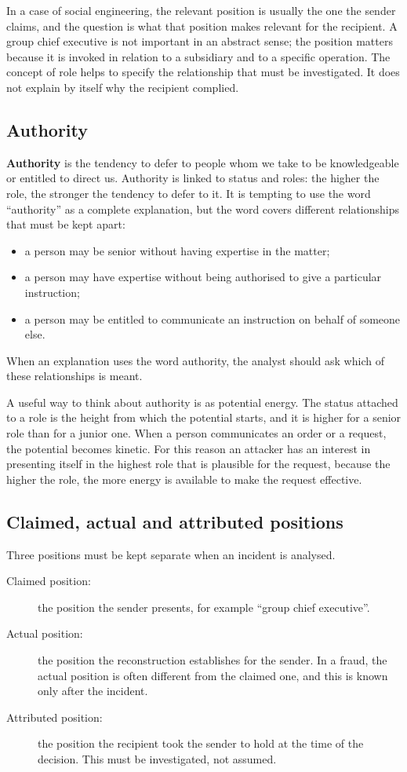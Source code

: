 In a case of social engineering, the relevant position is usually the one the sender claims, and the question is what that position makes relevant for the recipient. A group chief executive is not important in an abstract sense; the position matters because it is invoked in relation to a subsidiary and to a specific operation. The concept of role helps to specify the relationship that must be investigated. It does not explain by itself why the recipient complied.

\subsection{Authority}
\textbf{Authority} is the tendency to defer to people whom we take to be knowledgeable or entitled to direct us. Authority is linked to status and roles: the higher the role, the stronger the tendency to defer to it. It is tempting to use the word ``authority'' as a complete explanation, but the word covers different relationships that must be kept apart:
\begin{itemize}
	\item a person may be senior without having expertise in the matter;
	\item a person may have expertise without being authorised to give a particular instruction;
	\item a person may be entitled to communicate an instruction on behalf of someone else.
\end{itemize}
When an explanation uses the word authority, the analyst should ask which of these relationships is meant.

A useful way to think about authority is as potential energy. The status attached to a role is the height from which the potential starts, and it is higher for a senior role than for a junior one. When a person communicates an order or a request, the potential becomes kinetic. For this reason an attacker has an interest in presenting itself in the highest role that is plausible for the request, because the higher the role, the more energy is available to make the request effective.

\subsection{Claimed, actual and attributed positions}
Three positions must be kept separate when an incident is analysed.
\begin{description}
	\item[Claimed position:] the position the sender presents, for example ``group chief executive''.
	\item[Actual position:] the position the reconstruction establishes for the sender. In a fraud, the actual position is often different from the claimed one, and this is known only after the incident.
	\item[Attributed position:] the position the recipient took the sender to hold at the time of the decision. This must be investigated, not assumed.
\end{description}

